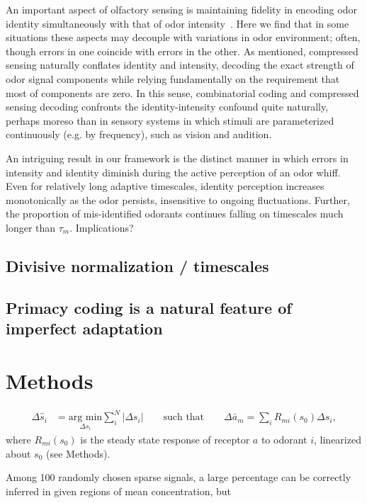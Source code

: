 An important aspect of olfactory sensing is maintaining fidelity in encoding odor identity simultaneously with that of odor intensity~\cite{Laruents papers}. Here we find that in some situations these aspects may decouple with variations in odor environment; often, though errors in one coincide with errors in the other. As mentioned, compressed sensing naturally conflates identity and intensity, decoding the exact strength of odor signal components while relying fundamentally on the requirement that most of components are zero. In this sense, combinatorial coding and compressed sensing decoding confronts the identity-intensity confound quite naturally, perhaps moreso than in sensory systems in which stimuli are parameterized continuously (e.g. by frequency), such as vision and audition.

An intriguing result in our framework is the distinct manner in which errors in intensity and identity diminish during the active perception of an odor whiff. Even for relatively long adaptive timescales, identity perception increases monotonically as the odor persists, insensitive to ongoing fluctuations. Further, the proportion of mis-identified odorants continues falling on timescales much longer than $\tau_m$. {\color{blue} Implications?}


\subsection*{Divisive normalization / timescales}


\subsection*{Primacy coding is a natural feature of imperfect adaptation}




\section*{Methods}



\begin{align}
\Delta \hat s_i &= \underset{\Delta s_i}{\text{arg min}} \sum_i^N|\Delta s_i| \qquad \text{such that} \qquad \Delta \bar a_m = \sum_i R_{mi}(s_0) \Delta s_i,
\end{align}
where $R_{mi}(s_0)$ is the steady state response of receptor $a$ to odorant $i$, linearized about $s_0$ (see Methods). 

Among 100 randomly chosen sparse signals, a large percentage can be correctly inferred in given regions of mean concentration, but 







